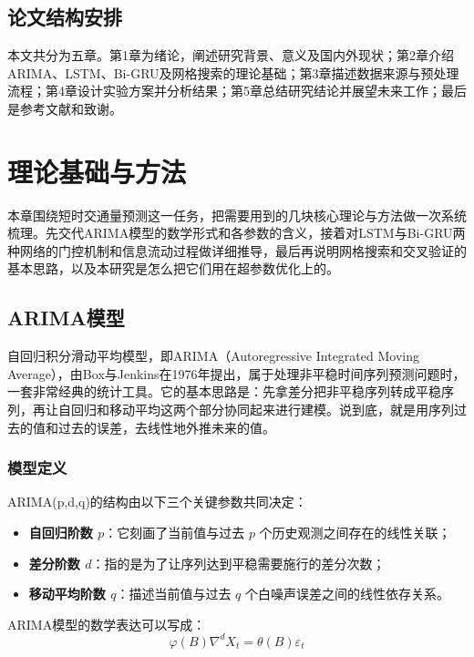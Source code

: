 \documentclass[12pt,a4paper,oneside]{ctexbook}
\begin{document}
	\section{论文结构安排}
	本文共分为五章。第1章为绪论，阐述研究背景、意义及国内外现状；第2章介绍ARIMA、LSTM、Bi-GRU及网格搜索的理论基础；第3章描述数据来源与预处理流程；第4章设计实验方案并分析结果；第5章总结研究结论并展望未来工作；最后是参考文献和致谢。
	
	\chapter{理论基础与方法}
	
	本章围绕短时交通量预测这一任务，把需要用到的几块核心理论与方法做一次系统梳理。先交代ARIMA模型的数学形式和各参数的含义，接着对LSTM与Bi-GRU两种网络的门控机制和信息流动过程做详细推导，最后再说明网格搜索和交叉验证的基本思路，以及本研究是怎么把它们用在超参数优化上的。
	
	\section{ARIMA模型}
	
	自回归积分滑动平均模型，即ARIMA（Autoregressive Integrated Moving Average），由Box与Jenkins在1976年提出，属于处理非平稳时间序列预测问题时，一套非常经典的统计工具。它的基本思路是：先拿差分把非平稳序列转成平稳序列，再让自回归和移动平均这两个部分协同起来进行建模。说到底，就是用序列过去的值和过去的误差，去线性地外推未来的值。
	
	\subsection{模型定义}
	
	ARIMA(p,d,q)的结构由以下三个关键参数共同决定：
	\begin{itemize}
		\item \textbf{自回归阶数 $p$}：它刻画了当前值与过去 $p$ 个历史观测之间存在的线性关联；
		\item \textbf{差分阶数 $d$}：指的是为了让序列达到平稳需要施行的差分次数；
		\item \textbf{移动平均阶数 $q$}：描述当前值与过去 $q$ 个白噪声误差之间的线性依存关系。
	\end{itemize}
	
	ARIMA模型的数学表达可以写成：
	\[
	\varphi(B)\nabla^d X_t = \theta(B)\varepsilon_t
	\]
	
\end{document}
